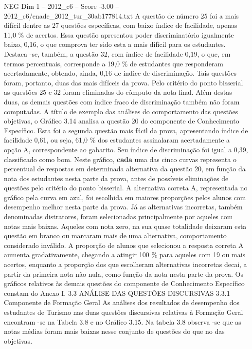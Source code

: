 \begin{textsample}{NEG Dim 1 – 2012\_c6 – Score -3.00 – 2012\_c6/enade\_2012\_tur\_30ab177814.txt}
A questão de número 25 foi a mais difícil dentre as 27 questões específicas, com baixo índice de facilidade, apenas 11,0 \% de acertos.
Essa questão apresentou poder discriminatório igualmente baixo, 0,16, o que comprova ter sido esta a mais difícil para os estudantes.
Destaca -se, também, a questão 32, com índice de facilidade 0,19, o que, em termos percentuais, corresponde a 19,0 \% de estudantes que responderam acertadamente, obtendo, ainda, 0,16 de índice de discriminação.
Tais questões foram, portanto, duas das mais difíceis da prova.
Pelo critério do ponto bisserial as questões 25 e 32 foram eliminadas do cômputo da nota final.
Além destas duas, as demais questões com índice fraco de discriminação também não foram computadas.
A título de exemplo das análises do comportamento das questões objetivas, o Gráfico 3.14 analisa a questão 20 do componente de Conhecimento Específico.
Esta foi a segunda questão mais fácil da prova, apresentando índice de facilidade 0,61, ou seja, 61,0 \% dos estudantes assinalaram acertadamente a opção A, correspondente ao gabarito.
Seu índice de discriminação foi igual a 0,39, classificado como bom.
Neste gráfico, \textbf{cada} uma das cinco curvas representa o percentual de respostas em determinada alternativa da questão 20, em função da nota dos estudantes nesta parte da prova, antes de possíveis eliminações de questões pelo critério do ponto bisserial.
A alternativa correta A, representada no gráfico pela curva em azul, foi escolhida em maiores proporções pelos alunos com desempenho melhor nesta parte da prova.
Já as alternativas incorretas, também denominadas distratores, foram selecionadas principalmente por aqueles com notas mais baixas.
Aqueles com nota zero, na sua quase totalidade deixaram esta questão em branco ou marcaram mais de uma alternativa, comportamento considerado inválido.
A proporção de alunos que selecionou a resposta correta A aumenta gradativamente, chegando a atingir 100 \% para aqueles com 19 ou mais acertos, enquanto a proporção dos que escolheram alternativas incorretas decai, a partir da primeira nota não nula, como função da nota nesta parte da prova.
Os gráficos relativos às demais questões do componente de Conhecimento Específico constam do Anexo I. 3.3 ANÁLISE DAS QUESTÕES DISCURSIVAS 3.3.1 Componente de Formação Geral As análises dos resultados de desempenho dos estudantes de Turismo nas duas questões discursivas relativas à Formação Geral encontram -se na Tabela 3.8 e no Gráfico 3.15.
Na tabela 3.8 observa -se que as notas médias foram mais baixas nesse conjunto de questões do que no das objetivas.

\end{textsample}
